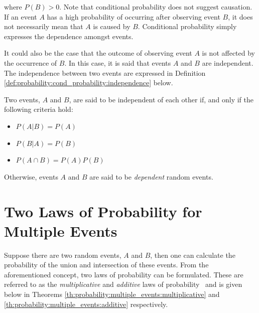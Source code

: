where $P(B) > 0$. Note that conditional probability does not suggest causation. If an event $A$ has a high probability of occurring after observing event $B$, it does not necessarily mean that $A$ is caused by $B$. Conditional probability simply expresses the dependence amongst events.

It could also be the case that the outcome of observing event $A$ is not affected by the occurrence of $B$. In this case, it is said that events $A$ and $B$ are independent. The independence between two events are expressed in Definition \ref{def:probability:cond_probability:independence} below.
\\
\begin{definition}
      \label{def:probability:cond_probability:independence}
      Two events, $A$ and $B$, are said to be independent of each other if, and only if the following criteria hold:

      \begin{itemize}
            \item $P(A \vert B) = P(A)$
            \item $P(B \vert A) = P(B)$
            \item $P(A \cap B) = P(A)P(B)$
      \end{itemize}

      Otherwise, events $A$ and $B$ are said to be \textit{dependent} random events.
\end{definition}

\section{Two Laws of Probability for Multiple Events}\label{sec:probability:multiple_events}

Suppose there are two random events, $A$ and $B$, then one can calculate the probability of the union and intersection of these events. From the aforementioned concept, two laws of probability can be formulated. These are referred to as the \textit{multiplicative} and \textit{additive} laws of probability~\cite{ref:wackerly:2014} and is given below in Theorems \ref{th:probability:multiple_events:multiplicative} and \ref{th:probability:multiple_events:additive} respectively.\\

